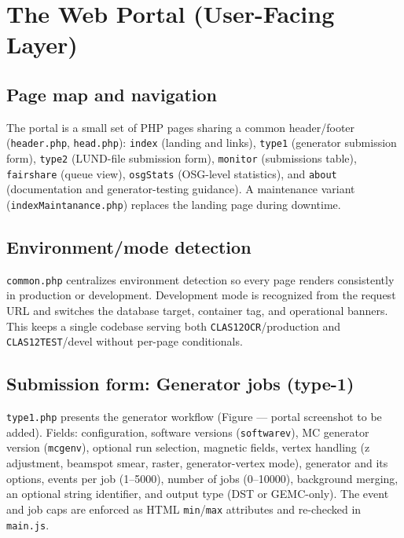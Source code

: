 \section{The Web Portal (User-Facing Layer)}\label{ch:3}

\subsection{Page map and navigation}

The portal is a small set of PHP pages sharing a common header/footer (\texttt{header.\allowbreak{}php},
\texttt{head.\allowbreak{}php}): \texttt{index} (landing and links), \texttt{type1} (generator submission
form), \texttt{type2} (LUND-file submission form), \texttt{monitor} (submissions table), \texttt{fairshare}
(queue view), \texttt{osgStats} (OSG-level statistics), and \texttt{about} (documentation and generator-testing
guidance). A maintenance variant (\texttt{indexMaintanance.\allowbreak{}php}) replaces the landing page during
downtime.

\subsection{Environment/mode detection}

\texttt{common.\allowbreak{}php} centralizes environment detection so every page renders consistently in
production or development. Development mode is recognized from the request URL and switches the database
target, container tag, and operational banners. This keeps a single codebase serving both
\texttt{CLAS12OCR}/production and \texttt{CLAS12TEST}/devel without per-page conditionals.

\subsection{Submission form: Generator jobs (type-1)}

\texttt{type1.\allowbreak{}php} presents the generator workflow (Figure --- portal screenshot to be added).
Fields: configuration, software versions (\texttt{softwarev}), MC generator version (\texttt{mcgenv}), optional
run selection, magnetic fields, vertex handling (z adjustment, beamspot smear, raster, generator-vertex mode),
generator and its options, events per job (1--5000), number of jobs (0--10000), background merging, an optional
string identifier, and output type (DST or GEMC-only). The event and job caps are enforced as HTML
\texttt{min}/\texttt{max} attributes and re-checked in \texttt{main.\allowbreak{}js}.

